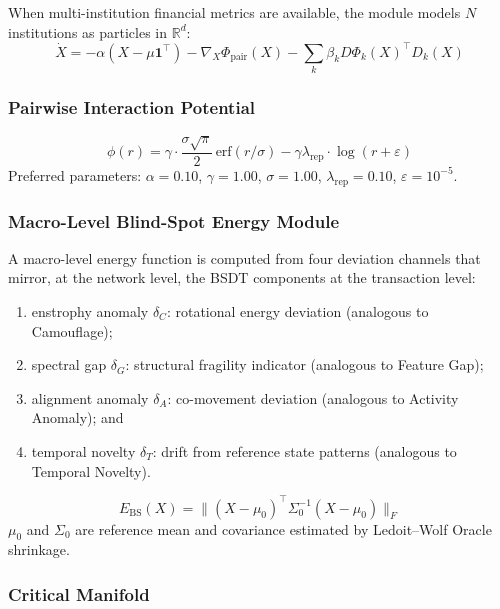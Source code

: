\documentclass[12pt,a4paper]{article}
\begin{document}
When multi-institution financial metrics are available, the module models
$N$ institutions as particles in $\mathbb{R}^d$:
\begin{equation}
\dot{X} = -\alpha(X-\mu\mathbf{1}^\top) - \nabla_X\Phi_{\mathrm{pair}}(X)
- \sum_k \beta_k D\Phi_k(X)^\top D_k(X)
\end{equation}

\subsubsection{Pairwise Interaction Potential}

\begin{equation}
\phi(r) = \gamma\cdot\frac{\sigma\sqrt{\pi}}{2}\,\mathrm{erf}(r/\sigma)
- \gamma\lambda_{\mathrm{rep}}\cdot\log(r+\varepsilon)
\end{equation}
Preferred parameters: $\alpha{=}0.10$, $\gamma{=}1.00$,
$\sigma{=}1.00$, $\lambda_{\mathrm{rep}}{=}0.10$, $\varepsilon{=}10^{-5}$.

\subsubsection{Macro-Level Blind-Spot Energy Module}

A macro-level energy function is computed from four deviation channels
that mirror, at the network level, the BSDT components at the transaction
level:
\begin{enumerate}[label=(\alph*)]
\item enstrophy anomaly $\delta_C$: rotational energy deviation (analogous
to Camouflage);
\item spectral gap $\delta_G$: structural fragility indicator (analogous
to Feature Gap);
\item alignment anomaly $\delta_A$: co-movement deviation (analogous to
Activity Anomaly); and
\item temporal novelty $\delta_T$: drift from reference state patterns
(analogous to Temporal Novelty).
\end{enumerate}

\begin{equation}
E_{\mathrm{BS}}(X) =
\|(X-\mu_0)^\top\Sigma_0^{-1}(X-\mu_0)\|_F
\end{equation}
$\mu_0$ and $\Sigma_0$ are reference mean and covariance estimated by
Ledoit--Wolf Oracle shrinkage.

\subsubsection{Critical Manifold}
\end{document}
